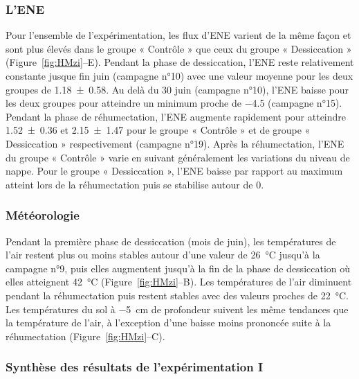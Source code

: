 \subsubsection{L'ENE}

Pour l'ensemble de l'expérimentation, les flux d'ENE varient de la même façon et sont plus élevés dans le groupe « Contrôle » que ceux du groupe « Dessiccation » (Figure~\ref{fig:HMzi}--E).
Pendant la phase de dessiccation, l'ENE reste relativement constante jusque fin juin (campagne n°10) avec une valeur moyenne pour les deux groupes de \SI{1.18(058)}{\uml}.
Au delà du 30 juin (campagne n°10), l'ENE baisse pour les deux groupes pour atteindre un minimum proche de \SI{-4.5}{\uml} (campagne n°15).
Pendant la phase de réhumectation, l'ENE augmente rapidement pour atteindre \num{1.52(036)} et \SI{2.15(147)}{\uml} pour le groupe « Contrôle » et de groupe « Dessiccation » respectivement (campagne n°19).
Après la réhumectation, l'ENE du groupe « Contrôle » varie en suivant généralement les variations du niveau de nappe.
Pour le groupe « Dessiccation », l'ENE baisse par rapport au maximum atteint lors de la réhumectation puis se stabilise autour de 0.

\subsubsection{Météorologie}

Pendant la première phase de dessiccation (mois de juin), les températures de l'air restent plus ou moins stables autour d'une valeur de \SI{26}{\degreeCelsius} jusqu'à la campagne n°9, puis elles augmentent jusqu'à la fin de la phase de dessiccation où elles atteignent \SI{42}{\degreeCelsius} (Figure~\ref{fig:HMzi}--B).
Les températures de l'air diminuent pendant la réhumectation puis restent stables avec des valeurs proches de \SI{22}{\degreeCelsius}.
Les températures du sol à \SI{-5}{\centi\metre} de profondeur suivent les même tendances que la température de l'air, à l'exception d'une baisse moins prononcée suite à la réhumectation (Figure~\ref{fig:HMzi}--C).


\subsubsection{Synthèse des résultats de l'expérimentation I}


